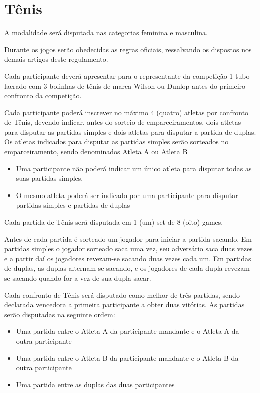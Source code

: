 {\let\clearpage\relax \chapter{Tênis}}

\begin{article}
	A modalidade será disputada nas categorias feminina e masculina.
\end{article}

\begin{article}
	Durante os jogos serão obedecidas as regras oficiais, ressalvando os dispostos nos demais artigos deste regulamento.
\end{article}

\begin{article}
	Cada participante deverá apresentar para o representante da competição 1 tubo lacrado com 3 bolinhas de tênis de marca Wilson ou Dunlop antes do primeiro confronto da competição.
\end{article}

\begin{article}
	Cada participante poderá inscrever no máximo 4 (quatro) atletas por confronto de Tênis, devendo indicar, antes do sorteio de emparceiramentos, dois atletas para disputar as partidas simples e dois atletas para disputar a partida de duplas. Os atletas indicados para disputar as partidas simples serão sorteados no emparceiramento, sendo denominados Atleta A ou Atleta B

	\begin{itemize}[noitemsep]
		\item Uma participante não poderá indicar um único atleta para disputar todas as suas partidas simples.
		\item O mesmo atleta poderá ser indicado por uma participante para disputar partidas simples e partidas de duplas
	\end{itemize}

	Cada partida de Tênis será disputada em 1 (um) set de 8 (oito) games.
\end{article}

\noindent
Antes de cada partida é sorteado um jogador para iniciar a partida sacando. Em partidas simples o jogador sorteado saca uma vez, seu adversário saca duas vezes e a partir daí os jogadores revezam-se sacando duas vezes cada um. Em partidas de duplas, as duplas alternam-se sacando, e os jogadores de cada dupla revezam-se sacando quando for a vez de sua dupla sacar.

\noindent
Cada confronto de Tênis será disputado como melhor de três partidas, sendo declarada vencedora a primeira participante a obter duas vitórias. As partidas serão disputadas na seguinte ordem:
\begin{itemize}[noitemsep]
	\item Uma partida entre o Atleta A da participante mandante e o Atleta A da outra participante
	\item Uma partida entre o Atleta B da participante mandante e o Atleta B da outra participante
	\item Uma partida entre as duplas das duas participantes
\end{itemize}

